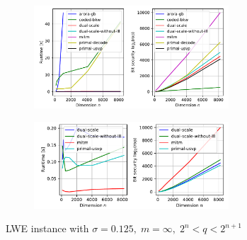 \begin{figure}[h!]
    \centering
    \begin{subfigure}{1\textwidth}
        \centering
        \includegraphics[width=0.8\textwidth]{graphics/LWE_stddev=0,125_plots_200s.pdf}
    \end{subfigure}
    \begin{subfigure}{1\textwidth}
        \centering
        \includegraphics[width=0.8\textwidth]{graphics/LWE_stddev=0,125_plots_1s.pdf}
    \end{subfigure}
    \caption{LWE instance with $\sigma=0.125,\; m=\infty, \; 2^{n} < q < 2^{n+1}$}\label{fig:LWE-algs-small}
\end{figure}
